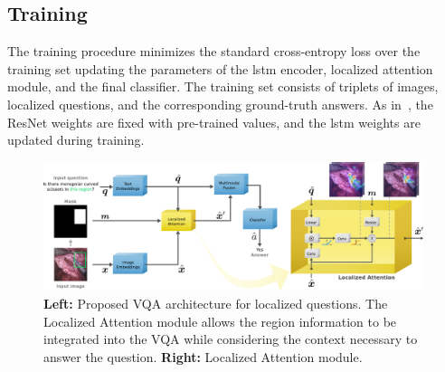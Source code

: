 \subsection{Training} The training procedure minimizes the standard cross-entropy loss over the training set updating the parameters of the \gls{lstm} encoder, localized attention module, and the final classifier. The training set consists of triplets of images, localized questions, and the corresponding ground-truth answers. As in~\cite{antol2015vqa}, the ResNet weights are fixed with pre-trained values, and the \gls{lstm} weights are updated during training.

\begin{figure}[!t]
\begin{center}
\includegraphics[width=0.99\textwidth]{Figures/Part1_LocVQA/01_locatt/method_new.pdf}
\caption{\textbf{Left:} Proposed VQA architecture for localized questions. The Localized Attention module allows the region information to be integrated into the VQA while considering the context necessary to answer the question. \textbf{Right:} Localized Attention module.  
}
\label{fig:method_locvqa}
\end{center}
\end{figure}